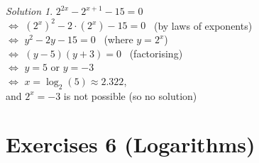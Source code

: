 \documentclass[
  12pt,
  oneside]{book}
\theoremstyle{definition}
\theoremstyle{definition}
\theoremstyle{definition}
\theoremstyle{definition}
\theoremstyle{remark}
\newtheorem*{solution}{Solution}
\begin{document}
\begin{solution}
\(2^{2x}-2^{x+1}-15=0\)\\
\(\iff\) \(\left(2^x\right)^2-2\cdot\left(2^x\right)-15=0\) \hfill~{(by laws of exponents)}\\
\(\iff\) \(y^2 -2y-15=0\) \hfill~{(where \(y=2^x\))}\\
\(\iff\) \((y-5)(y+3)=0\) \hfill~{(factorising)}\\
\(\iff\) \(y=5\) or \(y=-3\)\\
\(\iff\) \(x=\log_2(5)\approx 2.322\),\\
and \(2^x=-3\) is not possible (so no solution)
\end{solution}

\hypertarget{exercises-6-logarithms}{%
\chapter*{Exercises 6 (Logarithms)}\label{exercises-6-logarithms}}
\end{document}
